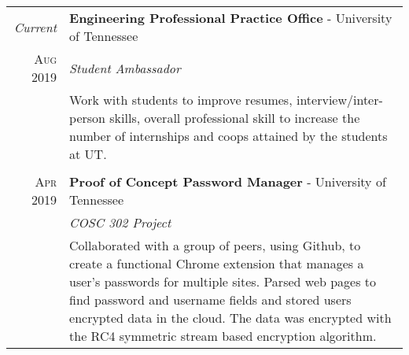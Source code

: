 \documentclass[a4paper,11pt]{article}
\begin{document}
\begin{tabularx}{\textwidth}{r|X}

   \emph{Current} & \textbf{Engineering Professional Practice Office} \-- University of Tennessee\\
   \textsc{Aug 2019} & \emph{Student Ambassador}\\
   & \small{Work with students to improve resumes, interview/inter-person skills, overall professional skill to increase the number of internships and coops attained by the students at UT\@.
   }\\

   \multicolumn{2}{c}{} \\

   \textsc{Apr 2019} & \textbf{Proof of Concept Password Manager} \-- University of Tennessee\\
   & \emph{COSC 302 Project}\\
   & \small{Collaborated with a group of peers, using Github, to create a functional Chrome extension that manages a user's passwords for multiple sites.
            Parsed web pages to find password and username fields and stored users encrypted data in the cloud.
            The data was encrypted with the RC4 symmetric stream based encryption algorithm.
   }\\
\end{tabularx}

\end{document}
